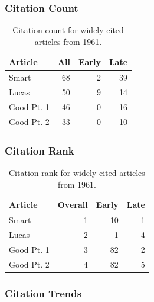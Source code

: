 \documentclass[
  10pt,
  letterpaper,
  DIV=11,
  numbers=noendperiod,
  twoside]{scrartcl}
\begin{document}
\subsubsection*{Citation Count}\label{sec-count-1961}

\begin{longtable}[]{@{}lrrr@{}}

\caption{\label{tbl-citation-count-1961}Citation count for widely cited
articles from 1961.}

\tabularnewline

\toprule\noalign{}
Article & All & Early & Late \\
\midrule\noalign{}
\endhead
\bottomrule\noalign{}
\endlastfoot
Smart & 68 & 2 & 39 \\
Lucas & 50 & 9 & 14 \\
Good Pt. 1 & 46 & 0 & 16 \\
Good Pt. 2 & 33 & 0 & 10 \\

\end{longtable}

\subsubsection*{Citation Rank}\label{sec-rank-1961}

\begin{longtable}[]{@{}lrrr@{}}

\caption{\label{tbl-citation-rank-1961}Citation rank for widely cited
articles from 1961.}

\tabularnewline

\toprule\noalign{}
Article & Overall & Early & Late \\
\midrule\noalign{}
\endhead
\bottomrule\noalign{}
\endlastfoot
Smart & 1 & 10 & 1 \\
Lucas & 2 & 1 & 4 \\
Good Pt. 1 & 3 & 82 & 2 \\
Good Pt. 2 & 4 & 82 & 5 \\

\end{longtable}

\subsubsection*{Citation Trends}\label{sec-trends-1961}
\end{document}
